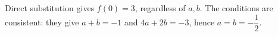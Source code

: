 Direct substitution gives $f(0)=\boxed3$, regardless of $a,b$. The conditions are consistent: they give $a+b=-1$ and $4a+2b=-3$, hence $a=b=-\dfrac{1}{2}$.
